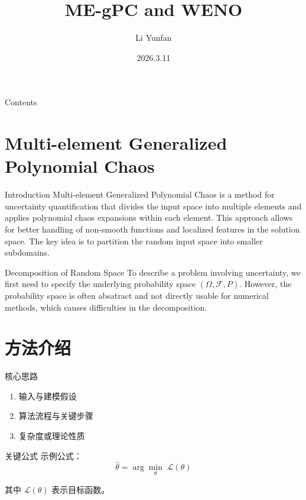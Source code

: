 \documentclass[10pt,aspectratio=169,professionalfonts]{beamer}
\title{ME-gPC and WENO}
\author{Li Yunfan}
\institute{Zhejiang University}
\date{2026.3.11}
\begin{document}
\begin{frame}
	\titlepage
\end{frame}

\begin{frame}{Contents}
	\tableofcontents
\end{frame}

\section{Multi-element Generalized Polynomial Chaos}

\begin{frame}{Introduction}
    \justifying
	Multi-element Generalized Polynomial Chaos is a method for 
    uncertainty quantification that divides the input space into 
    multiple elements and applies polynomial chaos expansions within 
    each element. This approach allows for better handling of non-smooth 
    functions and localized features in the solution space.
    The key idea is to partition the random input space 
    into smaller subdomains.
\end{frame}

\begin{frame}{Decomposition of Random Space}
    \justifying
	To describe a problem involving uncertainty, 
    we first need to specify the 
    underlying probability space \((\Omega,\mathcal{F},P)\).
    However, the probability space is often absatract and 
    not directly usable for numerical methods, 
	which causes difficulties in the decomposition.\cite{WAN2005617}\cite{Wan2006}\cite{FOO20089572}
    
    
\end{frame}

\section{方法介绍}

\begin{frame}{核心思路}
	\begin{enumerate}
		\item 输入与建模假设
		\item 算法流程与关键步骤
		\item 复杂度或理论性质
	\end{enumerate}
\end{frame}

\begin{frame}{关键公式}
	示例公式：
	\[
		\hat{\theta} = \arg\min_{\theta} \; \mathcal{L}(\theta)
	\]

	\vspace{0.6em}
	其中 \(\mathcal{L}(\theta)\) 表示目标函数。
\end{frame}
\end{document}
